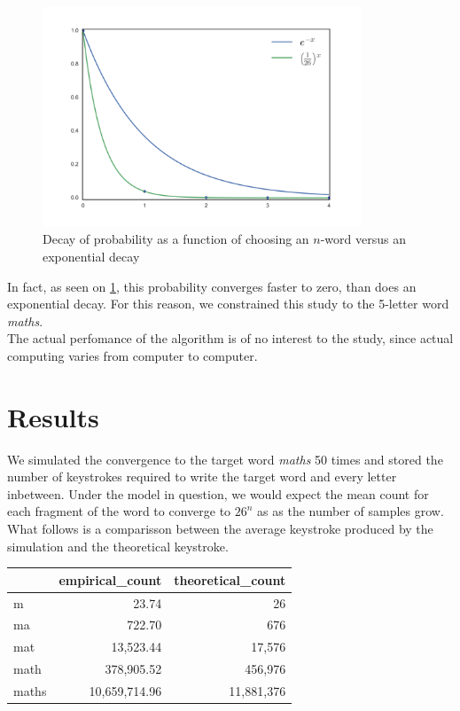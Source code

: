 \documentclass{article}
\begin{document}
\begin{figure}[h]
    \centering
    \includegraphics[width=0.85\textwidth]{decay}
    \caption{Decay of probability as a function of choosing an $n$-word versus an exponential decay}
    \label{fig:decay}
\end{figure}

In fact, as seen on \ref{fig:decay}, this probability converges faster to zero, than does an exponential decay. For this reason, we constrained this study to the 5-letter word \textit{maths}.\\


The actual perfomance of the algorithm is of no interest to the study, since actual computing varies from computer to computer.

\section{Results}
We simulated the convergence to the target word \textit{maths} 50 times and stored the number of keystrokes required to write the target word and every letter inbetween. Under the model in question, we would expect the mean count for each fragment of the word to converge to $26^n$ as as the number of samples grow. What follows is a comparisson between the average keystroke produced by the simulation and the theoretical keystroke.

\begin{center}
\begin{tabular}{l|r|r}
\toprule
{} &  empirical\_count &  theoretical\_count \\
\midrule
\hline
m     &            23.74 &                 26 \\
ma    &           722.70 &                676 \\
mat   &         13,523.44 &              17,576 \\
math  &        378,905.52 &             456,976 \\
maths &      10,659,714.96 &           11,881,376 \\
\bottomrule
\end{tabular}
\end{center}
\end{document}
